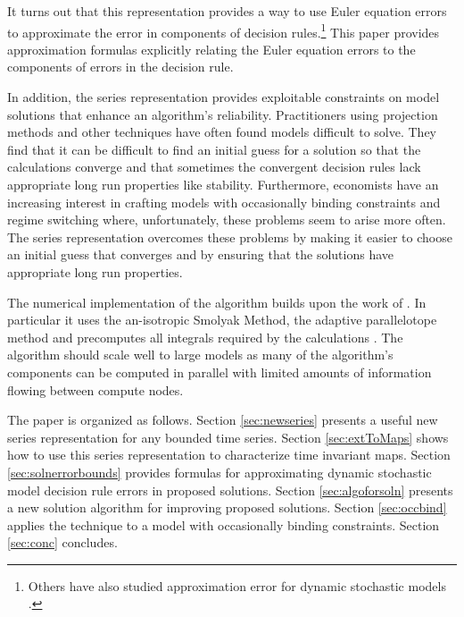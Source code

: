 \documentclass[12pt]{article}
\begin{document}
    It turns out that this representation provides a way to use
    Euler equation errors to
    approximate the error in components of 
    decision rules.\footnote{    Others have also studied approximation error for dynamic stochastic models \citep{judd2017lower,santos2005accuracy,Santos2000accuracy}.} This paper provides  approximation formulas
    explicitly relating the
    Euler equation errors to the components of
    errors in the decision rule.

In addition, the series representation provides exploitable constraints on model solutions that enhance an algorithm's reliability.
Practitioners using projection methods and other techniques
have often found models difficult to solve.
They find that
it can be difficult to find an initial guess for a solution so that 
the calculations converge and that sometimes the convergent decision rules
lack appropriate long run properties like stability.
Furthermore, economists have an increasing interest in crafting models with
occasionally binding constraints and regime switching where, unfortunately, these problems seem to arise more often.
The series representation overcomes these problems by making it easier to choose an initial guess
that converges and by ensuring that the solutions have appropriate long run 
properties.



The numerical implementation of the algorithm 
builds upon the work of
\citep{juddGSSA2011,JuddIntegrals}.
In particular it uses
the an-isotropic Smolyak Method, the adaptive
parallelotope method \citep{Judd2014}
and precomputes all integrals required by the calculations  \citep{JuddIntegrals}.
The algorithm should scale well to large models as many 
of the algorithm's components can be computed in parallel with limited amounts of information flowing between compute nodes.











The paper is organized as follows.
Section \ref{sec:newseries} presents a useful new series representation for any bounded time series.
Section \ref{sec:extToMaps} shows how to use this series representation to characterize time invariant maps.
Section \ref{sec:solnerrorbounds} provides formulas for approximating dynamic stochastic model decision rule errors in proposed solutions.
Section \ref{sec:algoforsoln} presents a new solution algorithm for improving proposed solutions.
Section \ref{sec:occbind} applies the technique to a model with 
occasionally binding constraints.
Section \ref{sec:conc} concludes.
\end{document}
